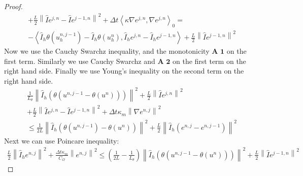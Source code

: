 \documentclass[../Main/main.tex]{subfiles}
\begin{document}
\begin{proof}
\begin{equation}
\begin{gathered}
				 + \frac{L}{2}\left \| \hat{I} e^{j,n}-\hat{I}e^{j-1,n} \right \|^2 + 
				\Delta t \left \langle \kappa\nabla e^{j,n},\nabla e^{j,n} \right \rangle_0  = \\ - \left \langle \hat{I}_h \theta(u^{n,j-1}_h) - \hat{I}_h \theta(u^{n}_h),\hat{I}_h e^{j,n} - \hat{I}_h e^{j-1,n}\right \rangle+\frac{L}{2}\left \| \hat{I} e^{j-1,n}\right \|^2
			\end{gathered}
		\end{equation}
		Now we use the Cauchy Swarchz inequality, and the monotonicity $\textbf{A 1}$ on the first term. Similarly we use Cauchy Swarchz and $\textbf{A 2}$ on the first term on the right hand side. Finally we use Young's inequality on the second term on the right hand side.
		\begin{equation}
			\begin{gathered}
				\frac{1}{L_{\theta}}\left \| \hat{I}_h (\theta(u^{n,j-1}-\theta(u^{n}))) \right \|^2 + \frac{L}{2}\left \| \hat{I} e^{j,n}\right \|^2 \\
				+ \frac{L}{2}\left \| \hat{I} e^{j,n}-\hat{I}e^{j-1,n} \right \|^2 + \Delta t \kappa_m \left \| \nabla e^{n,j} \right \|^2 \\
				\leq \frac{1}{2L} \left \| \hat{I}_h(\theta (u^{n,j-1})-\theta (u^n) ) \right \|^2  + \frac{L}{2} \left \|\hat{I}_h( e^{n,j} - e^{n,j-1}) \right \|^2
			\end{gathered}
		\end{equation} 
		Next we can use Poincare inequality:
		\begin{equation}
			\begin{gathered}
				\frac{L}{2}\left \| \hat{I}_h e^{n,j}\right\|^2 + \frac{\Delta t \kappa_m}{C_{\Omega}} \left \|e^{n,j} \right \|^2 \leq (\frac{1}{2L} - \frac{1}{L_{\theta}}) \left \| \hat{I}_h(\theta (u^{n,j-1}-\theta (u^n))) \right \|^2 +\frac{L}{2}\left \| \hat{I} e^{j-1,n}\right \|^2
			\end{gathered}
		\end{equation}
	\end{proof}
	
\end{document}
